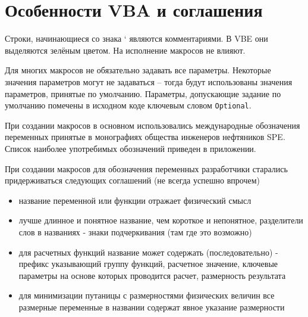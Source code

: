 \section{Особенности VBA и соглашения \unf{}}
Строки, начинающиеся со знака ‘ являются комментариями. В VBE они выделяются зелёным цветом. На исполнение макросов не влияют.

Для многих макросов не обязательно задавать все параметры. Некоторые значения параметров могут не задаваться – тогда будут использованы значения параметров, принятые по умолчанию. Параметры, допускающие задание по умолчанию помечены в исходном коде ключевым словом \texttt{Optional}.

При создании макросов в основном использовались международные обозначения переменных принятые в монографиях общества инженеров нефтяников SPE. Список наиболее употребимых обозначений приведен в приложении. 

При создании макросов для обозначения переменных разработчики старались придерживаться следующих соглашений (не всегда успешно впрочем)
\begin{itemize}
	\item название переменной или функции отражает физический смысл 
	\item лучше длинное и понятное название, чем короткое и непонятное, разделители слов в названиях - знаки подчеркивания (там где это возможно)
	\item для расчетных функций название может содержать (последовательно) - префикс указывающий группу функций, расчетное значение, ключевые параметры на основе которых проводится расчет, размерность результата
	\item для минимизации путаницы с размерностями физических величин все размерные переменные в названии содержат явное указание размерности
\end{itemize}

